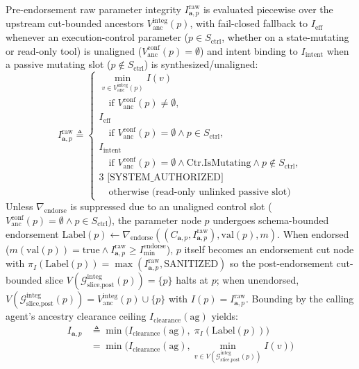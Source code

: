 \documentclass[conference,10pt]{IEEEtran}
\begin{document}
Pre-endorsement raw parameter integrity $I_{\mathbf{a}, p}^{\text{raw}}$ is evaluated piecewise over the upstream cut-bounded ancestors $V_{\text{anc}}^{\text{integ}}(p)$, with fail-closed fallback to $I_{\text{eff}}$ whenever an execution-control parameter ($p \in S_{\text{ctrl}}$, whether on a state-mutating or read-only tool) is unaligned ($V_{\text{anc}}^{\text{conf}}(p) = \emptyset$) and intent binding to $I_{\text{intent}}$ when a passive mutating slot ($p \notin S_{\text{ctrl}}$) is synthesized/unaligned:
\begin{equation}
\label{eq:param_integ}
I_{\mathbf{a}, p}^{\text{raw}} \triangleq \begin{cases}
\min_{v \in V_{\text{anc}}^{\text{integ}}(p)} I(v) \\
\quad \text{if } V_{\text{anc}}^{\text{conf}}(p) \ne \emptyset, \\
I_{\text{eff}} \\
\quad \text{if } V_{\text{anc}}^{\text{conf}}(p) = \emptyset \land p \in S_{\text{ctrl}}, \\
I_{\text{intent}} \\
\quad \text{if } V_{\text{anc}}^{\text{conf}}(p) = \emptyset \land \text{Ctr.IsMutating} \land p \notin S_{\text{ctrl}}, \\
3 \text{ [SYSTEM\_AUTHORIZED]} \\
\quad \text{otherwise (read-only unlinked passive slot)}
\end{cases}
\end{equation}
Unless $\nabla_{\text{endorse}}$ is suppressed due to an unaligned control slot ($V_{\text{anc}}^{\text{conf}}(p) = \emptyset \land p \in S_{\text{ctrl}}$), the parameter node $p$ undergoes schema-bounded endorsement $\text{Label}(p) \leftarrow \nabla_{\text{endorse}}((C_{\mathbf{a}, p}, I_{\mathbf{a}, p}^{\text{raw}}), \text{val}(p), m)$. When endorsed ($m(\text{val}(p)) = \text{true} \land I_{\mathbf{a}, p}^{\text{raw}} \ge I_{\text{min}}^{\text{endorse}}$), $p$ itself becomes an endorsement cut node with $\pi_I(\text{Label}(p)) = \max(I_{\mathbf{a}, p}^{\text{raw}}, \text{SANITIZED})$ so the post-endorsement cut-bounded slice $V(\mathcal{G}_{\text{slice,post}}^{\text{integ}}(p)) = \{p\}$ halts at $p$; when unendorsed, $V(\mathcal{G}_{\text{slice,post}}^{\text{integ}}(p)) = V_{\text{anc}}^{\text{integ}}(p) \cup \{p\}$ with $I(p) = I_{\mathbf{a}, p}^{\text{raw}}$. Bounding by the calling agent's ancestry clearance ceiling $I_{\text{clearance}}(\text{ag})$ yields:
\begin{equation}
\begin{aligned}
I_{\mathbf{a}, p} &\triangleq \min\big(I_{\text{clearance}}(\text{ag}), \; \pi_I(\text{Label}(p))\big) \\
&= \min\Big(I_{\text{clearance}}(\text{ag}), \min_{v \in V(\mathcal{G}_{\text{slice,post}}^{\text{integ}}(p))} I(v)\Big)
\end{aligned}
\end{equation}
\end{document}
